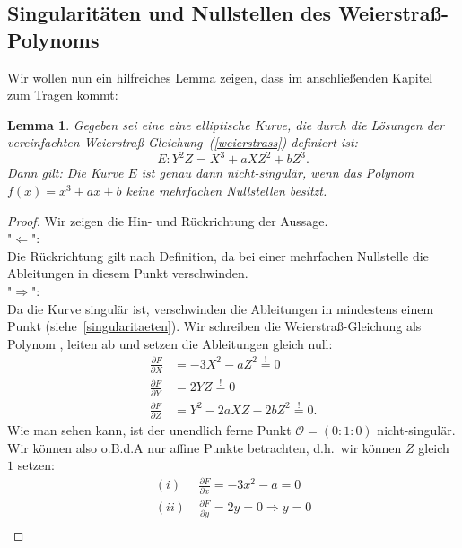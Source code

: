 \documentclass[hidelinks]{article}
\theoremstyle{plain}
\newtheorem{lem}[thm]{Lemma}
\theoremstyle{definition}
\theoremstyle{rem}
\newcommand{\patinf}{\mathcal{O}}
\begin{document}
\begin{sloppypar}
\subsection{Singularitäten und Nullstellen des Weierstraß-Polynoms}
Wir wollen nun ein hilfreiches Lemma zeigen, dass im anschließenden Kapitel zum Tragen kommt:
\begin{lem}
    Gegeben sei eine eine elliptische Kurve, die durch die Lösungen der vereinfachten Weierstraß-Gleichung~(\ref{weierstrass}) definiert ist:
    \begin{equation}
        E: Y^2Z = X^3 + aXZ^2 + bZ^3. 
    \end{equation}
    Dann gilt: Die Kurve $E$ ist genau dann nicht-singulär, wenn das Polynom $f(x) = x^3 + ax + b$ keine mehrfachen Nullstellen besitzt.
\end{lem}
\begin{proof} Wir zeigen die Hin- und Rückrichtung der Aussage.\\
    "$\Leftarrow$": \\
    Die Rückrichtung gilt nach Definition, da bei einer mehrfachen Nullstelle die Ableitungen in diesem Punkt verschwinden.\\
    "$\Rightarrow$": \\
    Da die Kurve singulär ist, verschwinden die Ableitungen in mindestens einem Punkt (siehe~\ref{singularitaeten}).
    Wir schreiben die Weierstraß-Gleichung als Polynom , leiten ab und setzen die Ableitungen gleich null:
    \begin{equation*}
        \begin{split}
		\frac{\partial F}{\partial X} & = -3X^2 - aZ^2 \stackrel{!}{=} 0 \\
            \frac{\partial F}{\partial Y} & = 2YZ \stackrel{!}{=}0 \\
            \frac{\partial F}{\partial Z} & = Y^2 - 2aXZ - 2bZ^2\stackrel{!}{=} 0.
        \end{split}
    \end{equation*}
    Wie man sehen kann, ist der unendlich ferne Punkt $\patinf = (0:1:0)$ nicht-singulär. Wir können also o.B.d.A nur affine Punkte betrachten, d.h.\ wir können $Z$ gleich $1$ setzen:
    \begin{equation*}
        \begin{split}
	    (i) \: & \frac{\partial F}{\partial x}  = -3x^2 - a = 0 \\
	    (ii) \: & \frac{\partial F}{\partial y}  = 2y = 0 \Rightarrow y = 0 \\

\end{split}
\end{equation*}
\end{proof}
\end{sloppypar}
\end{document}
